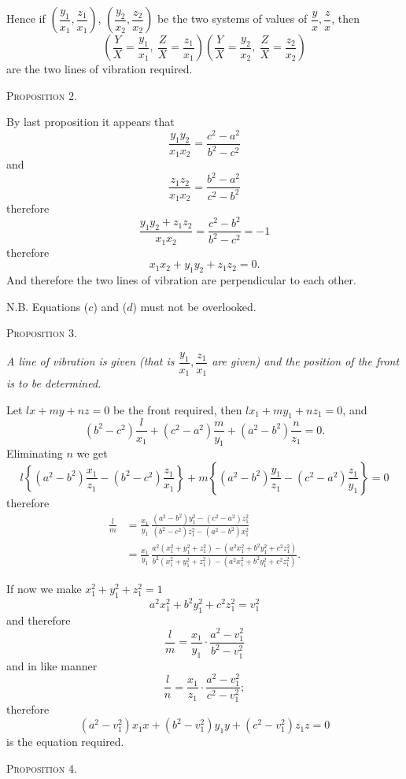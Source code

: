 \documentclass[11pt]{article}
\newcommand{\proposition}[1]{\vspace{0.9em}\begin{center}{\scshape Proposition #1.}\end{center}\vspace{0.2em}}
\newcommand{\sourcepage}[1]{\marginpar{\scriptsize p.~#1}}
\newcommand{\tagtext}[1]{\tag{#1}}
\begin{document}
\sourcepage{4}
Hence if $\left(\dfrac{y_1}{x_1},\dfrac{z_1}{x_1}\right)$, $\left(\dfrac{y_2}{x_2},\dfrac{z_2}{x_2}\right)$ be the two systems of values of $\dfrac{y}{x},\dfrac{z}{x}$, then
\[
\left(\frac{Y}{X}=\frac{y_1}{x_1},\ \frac{Z}{X}=\frac{z_1}{x_1}\right)
\left(\frac{Y}{X}=\frac{y_2}{x_2},\ \frac{Z}{X}=\frac{z_2}{x_2}\right)
\]
are the two lines of vibration required.

\proposition{2}

By last proposition it appears that
\begin{equation}
 \frac{y_1y_2}{x_1x_2}=\frac{c^2-a^2}{b^2-c^2} \tagtext{$c$}
\end{equation}
and
\begin{equation}
 \frac{z_1z_2}{x_1x_2}=\frac{b^2-a^2}{c^2-b^2} \tagtext{$d$}
\end{equation}
therefore
\[
 \frac{y_1y_2+z_1z_2}{x_1x_2}=\frac{c^2-b^2}{b^2-c^2}=-1
\]
therefore
\[
 x_1x_2+y_1y_2+z_1z_2=0.
\]
And therefore the two lines of vibration are perpendicular to each other.

N.B. Equations ($c$) and ($d$) must not be overlooked.

\proposition{3}

\emph{A line of vibration is given (that is $\dfrac{y_1}{x_1},\dfrac{z_1}{x_1}$ are given) and the position of the front is to be determined.}

Let $lx+my+nz=0$ be the front required, then $lx_1+my_1+nz_1=0$, and
\[
 (b^2-c^2)\frac{l}{x_1}+(c^2-a^2)\frac{m}{y_1}+(a^2-b^2)\frac{n}{z_1}=0.
\]
Eliminating $n$ we get
\[
 l\left\{(a^2-b^2)\frac{x_1}{z_1}-(b^2-c^2)\frac{z_1}{x_1}\right\}
+m\left\{(a^2-b^2)\frac{y_1}{z_1}-(c^2-a^2)\frac{z_1}{y_1}\right\}=0
\]
therefore
\begin{align*}
\frac{l}{m}
&=\frac{x_1}{y_1}\,
\frac{(a^2-b^2)y_1^2-(c^2-a^2)z_1^2}{(b^2-c^2)z_1^2-(a^2-b^2)x_1^2}\\
&=\frac{x_1}{y_1}\,
\frac{a^2(x_1^2+y_1^2+z_1^2)-(a^2x_1^2+b^2y_1^2+c^2z_1^2)}
{b^2(x_1^2+y_1^2+z_1^2)-(a^2x_1^2+b^2y_1^2+c^2z_1^2)}.
\end{align*}

\sourcepage{5}
If now we make $x_1^2+y_1^2+z_1^2=1$
\[
 a^2x_1^2+b^2y_1^2+c^2z_1^2=v_1^2
\]
and therefore
\[
 \frac{l}{m}=\frac{x_1}{y_1}\cdot\frac{a^2-v_1^2}{b^2-v_1^2}
\]
and in like manner
\[
 \frac{l}{n}=\frac{x_1}{z_1}\cdot\frac{a^2-v_1^2}{c^2-v_1^2};
\]
therefore
\[
 (a^2-v_1^2)x_1x+(b^2-v_1^2)y_1y+(c^2-v_1^2)z_1z=0
\]
is the equation required.

\proposition{4}
\end{document}
